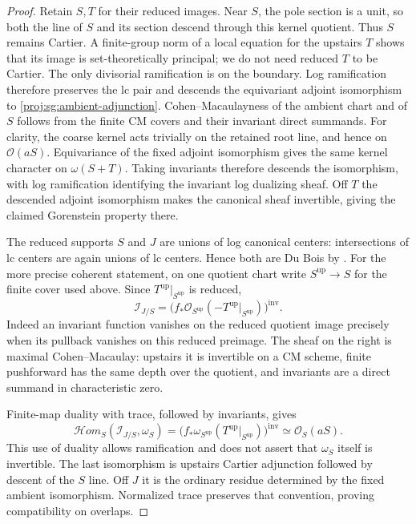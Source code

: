 \documentclass[11pt,letterpaper]{article}
\newcommand{\OO}{\mathcal{O}}
\theoremstyle{definition}
\theoremstyle{remark}
\begin{document}
\begin{proof}
Retain $S,T$ for their reduced images.  Near $S$, the pole
section is a unit, so both the line of $S$ and its section
descend through this kernel quotient.  Thus $S$ remains
Cartier.  A finite-group norm of a local equation for the
upstairs $T$ shows that its image is set-theoretically
principal; we do not need reduced $T$ to be Cartier.
The only divisorial ramification is on the boundary.
Log ramification therefore preserves the lc pair and descends
the equivariant adjoint isomorphism to
\eqref{proj:sg:ambient-adjunction}.  Cohen--Macaulayness of the
ambient chart and of $S$ follows from the finite CM covers
and their invariant direct summands.  For clarity, the
coarse kernel acts trivially on the retained root line,
and hence on $\OO(aS)$.  Equivariance of the fixed adjoint
isomorphism gives the same kernel character on
$\omega(S+T)$.  Taking invariants therefore descends the
isomorphism, with log ramification identifying the
invariant log dualizing sheaf.  Off $T$ the descended
adjoint isomorphism makes the canonical sheaf invertible,
giving the claimed Gorenstein property there.

The reduced supports $S$ and $J$ are unions of log canonical
centers: intersections of lc centers are again unions of
lc centers.  Hence both are Du Bois by
\cite[Theorems~1.4 and~1.7]{Proj-KollarKovacs2010}.
For the more precise coherent statement, on one quotient
chart write $S^{\mathrm{up}}\to S$ for the finite cover used
above.  Since $T^{\mathrm{up}}|_{S^{\mathrm{up}}}$ is reduced,
\[
 \mathcal I_{J/S}
 =
 \bigl(f_*\OO_{S^{\mathrm{up}}}
       (-T^{\mathrm{up}}|_{S^{\mathrm{up}}})\bigr)^{\mathrm{inv}}.
\]
Indeed an invariant function vanishes on the reduced quotient
image precisely when its pullback vanishes on this reduced
preimage.  The sheaf on the right is maximal Cohen--Macaulay:
upstairs it is invertible on a CM scheme, finite pushforward
has the same depth over the quotient, and invariants are a
direct summand in characteristic zero.

Finite-map duality with trace, followed by invariants, gives
\[
 \mathcal Hom_S(\mathcal I_{J/S},\omega_S)
 =
 \bigl(f_*\omega_{S^{\mathrm{up}}}
       (T^{\mathrm{up}}|_{S^{\mathrm{up}}})\bigr)^{\mathrm{inv}}
 \simeq\OO_S(aS).
\]
This use of duality allows ramification and does not assert
that $\omega_S$ itself is invertible.  The last isomorphism
is upstairs Cartier adjunction followed by descent of the
$S$ line.  Off $J$ it is the ordinary residue determined by
the fixed ambient isomorphism.  Normalized trace preserves
that convention, proving compatibility on overlaps.


\end{proof}
\end{document}
